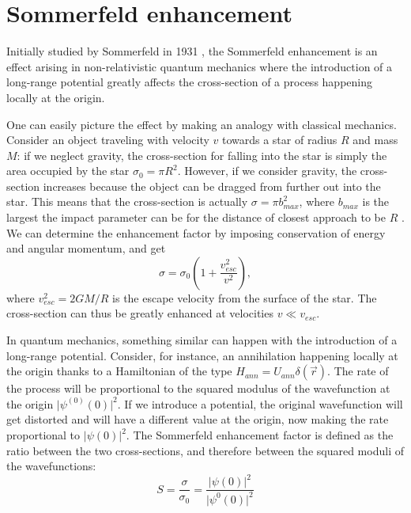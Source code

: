 \chapter{Sommerfeld enhancement}

Initially studied by Sommerfeld in 1931 \cite{Sommerfeld_1931}, the Sommerfeld enhancement is an effect arising in non-relativistic quantum mechanics where the introduction of a long-range potential greatly affects the cross-section of a process happening locally at the origin.

One can easily picture the effect by making an analogy with classical mechanics. Consider an object traveling with velocity \(v\) towards a star of radius \(R\) and mass \(M\): if we neglect gravity, the cross-section for falling into the star is simply the area occupied by the star \(\sigma _0=\pi R^2\). However, if we consider gravity, the cross-section increases because the object can be dragged from further out into the star. This means that the cross-section is actually \(\sigma = \pi b_{max}^2 \), where \(b_{max}\) is the largest the impact parameter can be for the distance of closest approach to be \(R\) \cite{Arkani_2009, Cirelli_2024}. We can determine the enhancement factor by imposing conservation of energy and angular momentum, and get
\begin{equation}
	\sigma = \sigma _0 \left( 1+ \frac{v_{esc} ^2}{v ^2} \right), 
\end{equation}
where \(v_{esc} ^2 = 2GM / R\) is the escape velocity from the surface of the star. The cross-section can thus be greatly enhanced at velocities \(v \ll v_{esc} \).

In quantum mechanics, something similar can happen with the introduction of a long-range potential. Consider, for instance, an annihilation happening locally at the origin thanks to a Hamiltonian of the type \(H_{ann} = U_{ann} \delta (\vec{r})\). The rate of the process will be proportional to the squared modulus of the wavefunction at the origin \(\vert \psi ^{(0)}(0) \vert^2 \). If we introduce a potential, the original wavefunction will get distorted and will have a different value at the origin, now making the rate proportional to \(\vert \psi (0) \vert^2 \). The Sommerfeld enhancement factor is defined as the ratio between the two cross-sections, and therefore between the squared moduli of the wavefunctions:
\begin{equation}\label{eq:sommerfeld_def}
	S = \frac{\sigma }{\sigma _0} = \frac{\vert \psi (0) \vert ^2}{\vert \psi ^{0}(0) \vert ^2}
\end{equation}

